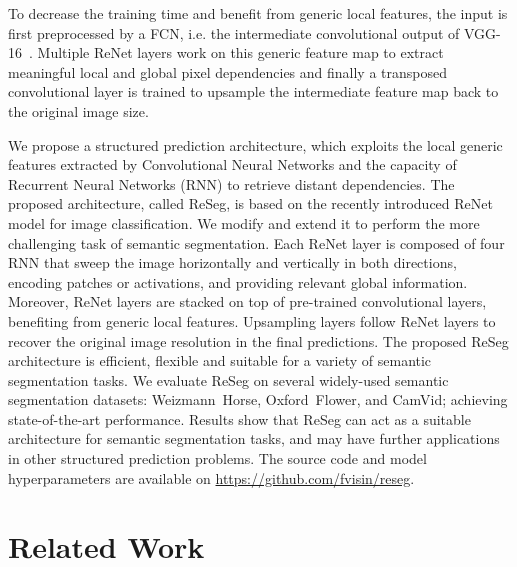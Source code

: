 
To decrease the training time and benefit from generic local features, the
input is first preprocessed by a FCN, i.e. the intermediate convolutional
output of VGG-16~\cite{Simonyan2015}. Multiple ReNet layers work on this
generic feature map to extract meaningful local and global pixel dependencies
and finally a transposed convolutional layer is trained to upsample the
intermediate feature map back to the original image size.

We propose a structured prediction architecture, which exploits the local
generic features extracted by Convolutional Neural Networks and the capacity of
Recurrent Neural Networks (RNN) to retrieve distant dependencies. The proposed
architecture, called ReSeg, is based on the recently introduced ReNet model for
image classification. We modify and extend it to perform the more challenging
task of semantic segmentation. Each ReNet layer is composed of four RNN that
sweep the image horizontally and vertically in both directions, encoding
patches or activations, and providing relevant global information. Moreover,
ReNet layers are stacked on top of pre-trained convolutional layers, benefiting
from generic local features. Upsampling layers follow ReNet layers to recover
the original image resolution in the final predictions. The proposed ReSeg
architecture is efficient, flexible and suitable for a variety of semantic
segmentation tasks. We evaluate ReSeg on several widely-used semantic
segmentation datasets: Weizmann~Horse, Oxford~Flower, and CamVid; achieving
state-of-the-art performance. Results show that ReSeg can act as a suitable
architecture for semantic segmentation tasks, and may have further applications
in other structured prediction problems. The source code and model
hyperparameters are available on
\href{https://github.com/fvisin/reseg}{https://github.com/fvisin/reseg}.


\section{Related Work}

